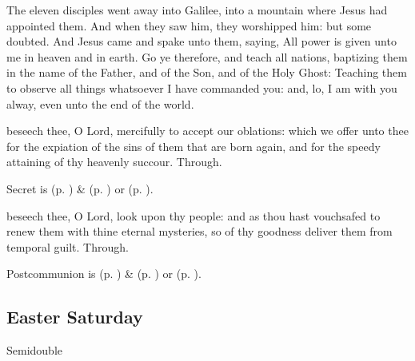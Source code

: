  The eleven disciples went away into Galilee, into a mountain where Jesus had appointed them. And when they saw him, they worshipped him: but some doubted. And Jesus came and spake unto them, saying, All power is given unto me in heaven and in earth. Go ye therefore, and teach all nations, baptizing them in the name of the Father, and of the Son, and of the Holy Ghost: Teaching them to observe all things whatsoever I have commanded you: and, lo, I am with you alway, even unto the end of the world.


\secret
{} beseech thee, O Lord, mercifully to accept our oblations: which we offer unto thee for the expiation of the sins of them that are born again, and for the speedy attaining of thy heavenly succour. Through.
\begin{rubric}
     Secret is  (p. \pageref{EasterSecret}) \&   (p. \pageref{SPAgainst}) or  (p. \pageref{SPChiefBishop}).
\end{rubric}



\postcommunion
{} beseech thee, O Lord, look upon thy people: and as thou hast vouchsafed to renew them with thine eternal mysteries, so of thy goodness deliver them from temporal guilt. Through.
\begin{rubric}
     Postcommunion is  (p. \pageref{EasterPostcommunion}) \&   (p. \pageref{SPAgainst}) or  (p. \pageref{SPChiefBishop}).
\end{rubric}


\clearpage
\subsection{Easter Saturday}
\begin{inhead}
    {Semidouble}
\end{inhead}

